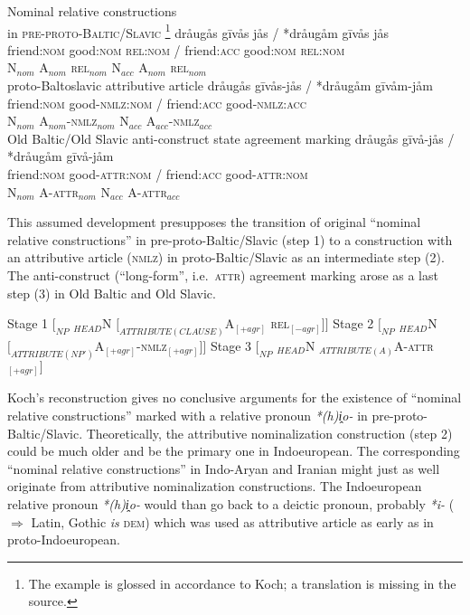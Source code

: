 \begin{exe}
\ex
\begin{xlist}
\ex	Nominal relative constructions\\in \textsc{pre}-\textsc{proto}-\textsc{Baltic/Slavic} \citep[468]{koch1999}\footnote{The example is glossed in accordance to Koch; a translation is missing in the source.}\label{koch rel}
\glll	*dråugås gīvås jås / *dråugåm gīvås jås\\
	friend:\textsc{nom} good:\textsc{nom} \textsc{rel:nom} / friend:\textsc{acc} good:\textsc{nom} \textsc{rel:nom}\\
	N$_{nom}$ A$_{nom}$ \textsc{rel}$_{nom}$ { } N$_{acc}$ A$_{nom}$ \textsc{rel}$_{nom}$\\
\ex	proto-Baltoslavic attributive article \label{koch nomzr}
\glll	*dråugås gīvås-jås / *dråugåm gīvåm-jåm\\
	friend:\textsc{nom} good-\textsc{nmlz:nom} / friend:\textsc{acc} good-\textsc{nmlz:acc}\\
	N$_{nom}$ A$_{nom}$-\textsc{nmlz}$_{nom}$ { } N$_{acc}$ A$_{acc}$-\textsc{nmlz}$_{acc}$\\
\ex	Old Baltic/Old Slavic anti-construct state agreement marking \label{koch attr}
\glll	*dråugås gīvå-jås / *dråugåm gīvå-jåm\\
	friend:\textsc{nom} good-\textsc{attr:nom} / friend:\textsc{acc} good-\textsc{attr:nom}\\
	N$_{nom}$ A-\textsc{attr}$_{nom}$ { } N$_{acc}$ A-\textsc{attr}$_{acc}$\\
\end{xlist}
\end{exe}
This assumed development presupposes the transition of original “nominal relative constructions” in pre-proto-Baltic/Slavic (step 1) to a construction with an attributive article (\textsc{nmlz}) in proto-Baltic/Slavic as an intermediate step (2). The anti-construct (“long-form”, i.e.~\textsc{attr}) agreement marking arose as a last step (3) in Old Baltic and Old Slavic.
\begin{exe}
\ex 
\begin{xlist}
\ex Stage 1 $[_{NP}$ $_{HEAD}$N $[_{ATTRIBUTE(CLAUSE)}$A$_{[+{agr}]}$ \textsc{rel}$_{[-{agr}]}$$] ]$
\ex Stage 2 $[_{NP}$ $_{HEAD}$N $[_{ATTRIBUTE(NP')}$A$_{[+{agr}]}$-\textsc{nmlz}$_{[+{agr}]}$$] ]$ \label{koch constit nomzr}
\ex Stage 3 $[_{NP}$ $_{HEAD}$N $_{ATTRIBUTE(A)}$A-\textsc{attr}$_{[+{agr}]}$$]$
\end{xlist}
\end{exe}
Koch's reconstruction gives no conclusive arguments for the existence of “nominal relative constructions” marked with a relative pronoun \textit{*(h)i̭o-} in pre-proto-Baltic/Slavic. Theoretically, the attributive nominalization construction (step 2) could be much older and be the primary one in Indoeuropean. The corresponding “nominal relative constructions” in Indo-Aryan and Iranian might just as well originate from attributive nominalization constructions. The Indoeuropean relative pronoun \textit{*(h)i̭o-} would than go back to a deictic pronoun, probably \textit{*i-} ($\Rightarrow$ Latin, Gothic \textit{is} \textsc{dem}) which was used as attributive article as early as in proto-Indoeuropean.

